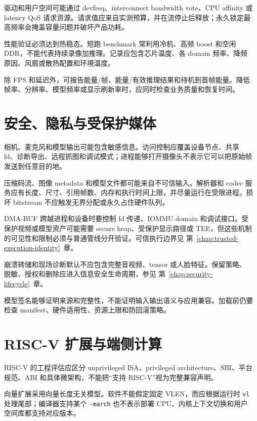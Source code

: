 驱动和用户空间可能通过 devfreq、interconnect bandwidth vote、CPU affinity 或 latency QoS 请求资源。请求值应来自实测预算，并在流停止后释放；永久锁定最高频率会掩盖容量问题并破坏产品功耗。

性能验证必须达到热稳态。短跑 benchmark 常利用冷机、高频 boost 和空闲 DDR，不能代表持续录像加推理。记录应包含芯片温度、各 domain 频率、降频原因、风扇或散热配置和环境温度。

除 FPS 和延迟外，可报告能量/帧、能量/有效推理结果和待机到首帧能量。降低帧率、分辨率、模型频率或显示刷新率时，应同时检查业务质量和恢复时间。

\section{安全、隐私与受保护媒体}

相机、麦克风和模型输出可能包含敏感信息。访问控制应覆盖设备节点、共享 fd、诊断导出、远程抓图和调试模式；进程能够打开摄像头不表示它可以把原始帧发送到任意目的地。

压缩码流、图像 metadata 和模型文件都可能来自不可信输入。解析器和 codec 服务应有长度、尺寸、引用帧数、内存和执行时间上限，并尽量运行在受限进程。损坏 bitstream 不应触发无界分配或永久占住硬件队列。

DMA-BUF 跨越进程和设备时要控制 fd 传递、IOMMU domain 和调试接口。受保护视频或模型资产可能需要 secure heap、受保护显示路径或 TEE，但这些机制的可见性和限制必须与普通管线分开验证。可信执行边界见 \mbox{第~\ref{chap:trusted-execution-identity}~章}。

崩溃转储和现场诊断默认不应包含完整音视频、tensor 或人脸特征。保留策略、脱敏、授权和删除应进入信息安全生命周期，参见 \mbox{第~\ref{chap:security-lifecycle}~章}。

模型签名能够证明来源和完整性，不能证明输入输出语义与应用兼容。加载前仍要检查 manifest、硬件适用性、资源上限和防回滚策略。

\section{RISC-V 扩展与端侧计算}

RISC-V 的工程评估应区分 unprivileged ISA、privileged architecture、SBI、平台规范、ABI 和具体微架构，不能把“支持 RISC-V”视为完整兼容声明\cite{riscvspec,riscvpri}。

向量扩展采用向量长度无关模型。软件不能假定固定 VLEN，而应根据运行时 \texttt{vl} 处理尾部；编译器支持某个 \texttt{-march} 也不表示部署 CPU、内核上下文切换和用户空间库都支持对应版本。

